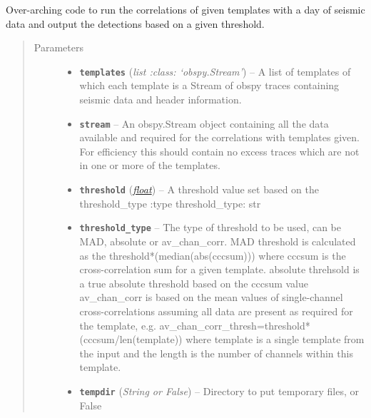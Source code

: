 \documentclass[a4paper,10pt,english]{sphinxmanual}
\begin{document}
\begin{fulllineitems}
\label{core:match_filter.match_filter}
Over-arching code to run the correlations of given templates with a day of
seismic data and output the detections based on a given threshold.
\begin{quote}\begin{description}
\item[{Parameters}] \leavevmode\begin{itemize}
\item {} 
\textbf{\texttt{templates}} (\emph{list :class: `obspy.Stream'}) -- A list of templates of which each template is a Stream of    obspy traces containing seismic data and header information.

\item {} 
\textbf{\texttt{stream}} -- An obspy.Stream object containing all the data available and    required for the correlations with templates given.  For efficiency this    should contain no excess traces which are not in one or more of the    templates.

\item {} 
\textbf{\texttt{threshold}} (\href{https://docs.python.org/library/functions.html\#float}{\emph{float}}) -- A threshold value set based on the threshold\_type    :type threshold\_type: str

\item {} 
\textbf{\texttt{threshold\_type}} -- The type of threshold to be used, can be MAD,    absolute or av\_chan\_corr.    MAD threshold is calculated as the    threshold*(median(abs(cccsum))) where cccsum is the cross-correlation sum    for a given template.    absolute threhsold is a true absolute threshold based on the cccsum value    av\_chan\_corr is based on the mean values of single-channel    cross-correlations assuming all data are present as required for the    template, e.g. av\_chan\_corr\_thresh=threshold*(cccsum/len(template)) where    template is a single template from the input and the length is the number    of channels within this template.

\item {} 
\textbf{\texttt{tempdir}} (\emph{String or False}) -- Directory to put temporary files, or False

\end{itemize}


\end{description}
\end{quote}
\end{fulllineitems}
\end{document}
